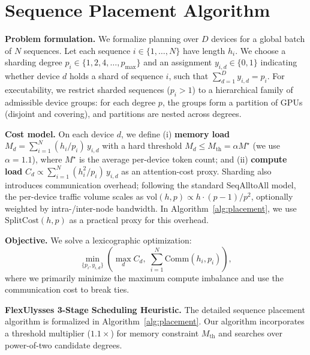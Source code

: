 \newpage
\appendix
\section{Sequence Placement Algorithm}\label{appendix:placement}

\noindent\textbf{Problem formulation.} We formalize planning over $D$ devices for a global batch of $N$ sequences. Let each sequence $i \in \{1,\dots,N\}$ have length $h_i$. We choose a sharding degree $p_i \in \{1,2,4,\dots,p_{\max}\}$ and an assignment $y_{i,d} \in \{0,1\}$ indicating whether device $d$ holds a shard of sequence $i$, such that $\sum_{d=1}^D y_{i,d} = p_i$. For executability, we restrict sharded sequences ($p_i>1$) to a hierarchical family of admissible device groups: for each degree $p$, the groups form a partition of GPUs (disjoint and covering), and partitions are nested across degrees.

\noindent\textbf{Cost model.} On each device $d$, we define (i) \textbf{memory load} $M_d = \sum_{i=1}^N (h_i / p_i)\, y_{i,d}$ with a hard threshold $M_d \le M_{\text{th}}=\alpha M^\star$ (we use $\alpha=1.1$), where $M^\star$ is the average per-device token count; and (ii) \textbf{compute load} $C_d \propto \sum_{i=1}^N (h_i^2 / p_i)\, y_{i,d}$ as an attention-cost proxy. Sharding also introduces communication overhead; following the standard SeqAlltoAll model, the per-device traffic volume scales as $\mathrm{vol}(h,p)\propto h\cdot(p-1)/p^2$, optionally weighted by intra-/inter-node bandwidth. In Algorithm~\ref{alg:placement}, we use $\mathrm{SplitCost}(h,p)$ as a practical proxy for this overhead.

\noindent\textbf{Objective.} We solve a lexicographic optimization:
\begin{equation}
    \min_{\{p_i, y_{i,d}\}} \left( \max_{d} C_d,\; \sum_{i=1}^N \mathrm{Comm}(h_i, p_i) \right),
\end{equation}
where we primarily minimize the maximum compute imbalance and use the communication cost to break ties.

\noindent\textbf{FlexUlysses 3-Stage Scheduling Heuristic.} The detailed sequence placement algorithm is formalized in Algorithm~\ref{alg:placement}. Our algorithm incorporates a threshold multiplier ($1.1\times$) for memory constraint $M_{\text{th}}$ and searches over power-of-two candidate degrees.

